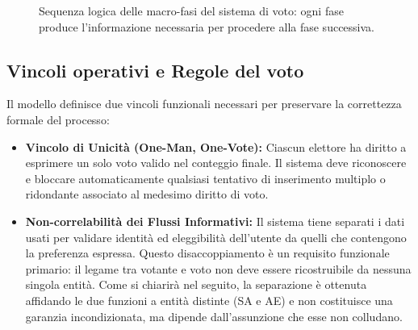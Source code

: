 \begin{figure}[H]

    \caption{Sequenza logica delle macro-fasi del sistema di voto: ogni fase produce l'informazione necessaria per procedere alla fase successiva.}
    \label{fig:fasi_protocollo}
\end{figure}


\subsection*{Vincoli operativi e Regole del voto}
Il modello definisce due vincoli funzionali necessari per preservare la correttezza formale del processo:
\begin{itemize}
    \item \textbf{Vincolo di Unicità (One-Man, One-Vote):} Ciascun elettore ha diritto a esprimere un solo voto valido nel conteggio finale. Il sistema deve riconoscere e bloccare automaticamente qualsiasi tentativo di inserimento multiplo o ridondante associato al medesimo diritto di voto.
    \item \textbf{Non-correlabilità dei Flussi Informativi:} Il sistema tiene separati i dati usati per validare identità ed eleggibilità dell'utente da quelli che contengono la preferenza espressa. Questo disaccoppiamento è un requisito funzionale primario: il legame tra votante e voto non deve essere ricostruibile da nessuna singola entità. Come si chiarirà nel seguito, la separazione è ottenuta affidando le due funzioni a entità distinte (SA e AE) e non costituisce una garanzia incondizionata, ma dipende dall'assunzione che esse non colludano.
\end{itemize}

